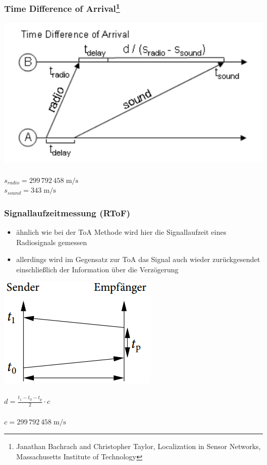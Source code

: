 \begin{frame}
\frametitle{Time Difference of Arrival\footnote{Janathan Bachrach and Christopher Taylor, Localization in Sensor Networks, Massachusetts Institute of Technology}}
  \begin{center}
    \includegraphics[scale=0.5]{img/tdoa1.png}\\~\\
  $s_{radio}=299\,792\,458\;\mathrm{m/s}$\\
  $s_{sound}=          343\;\mathrm{m/s}$
  \end{center}
\end{frame}

\begin{frame}
  \frametitle{Signallaufzeitmessung (RToF)}
  \begin{itemize}
    \item ähnlich wie bei der ToA Methode wird hier die Signallaufzeit eines Radiosignals gemessen
    \item allerdings wird im Gegensatz zur ToA das Signal auch wieder zurückgesendet einschließlich der Information über die Verzögerung
  \end{itemize}
  \begin{center}
    \includegraphics[scale=0.35]{img/time3}\\~\\

    $d = \frac{t_{1} - t_{0} - t_{p}}{2} \cdot c$\\~\\
    $c=299\,792\,458\;\mathrm{m/s}$
  \end{center}
\end{frame}

